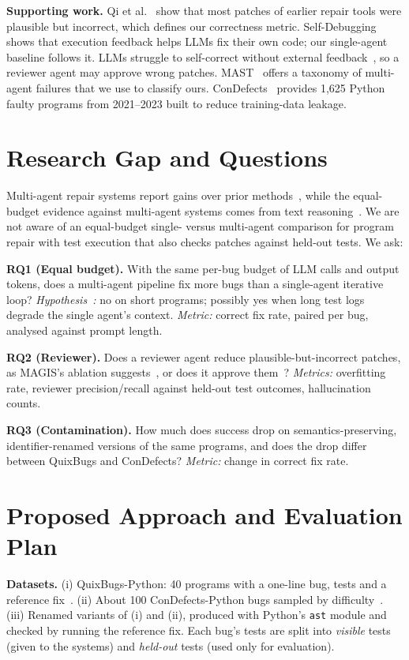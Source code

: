 \documentclass[conference]{IEEEtran}
\begin{document}
\textbf{Supporting work.} Qi et al.~\cite{qi2015} show that most patches of
earlier repair tools were plausible but incorrect, which defines our correctness
metric. Self-Debugging~\cite{selfdebug} shows that execution feedback helps
LLMs fix their own code; our single-agent baseline follows it. LLMs struggle to
self-correct without external feedback~\cite{selfcorrect}, so a reviewer agent
may approve wrong patches. MAST~\cite{mast} offers a taxonomy of multi-agent
failures that we use to classify ours. ConDefects~\cite{condefects} provides
1,625 Python faulty programs from 2021--2023 built to reduce training-data
leakage.

\section{Research Gap and Questions}
Multi-agent repair systems report gains over prior methods~\cite{unidebugger,magis},
while the equal-budget evidence against multi-agent systems comes from text
reasoning~\cite{trankiela}. We are not aware of an equal-budget single- versus
multi-agent comparison for program repair with test execution that also checks
patches against held-out tests. We ask:

\textbf{RQ1 (Equal budget).} With the same per-bug budget of LLM calls and output
tokens, does a multi-agent pipeline fix more bugs than a single-agent iterative
loop? \emph{Hypothesis~\cite{trankiela}:} no on short programs; possibly yes
when long test logs degrade the single agent's context. \emph{Metric:} correct
fix rate, paired per bug, analysed against prompt length.

\textbf{RQ2 (Reviewer).} Does a reviewer agent reduce plausible-but-incorrect
patches, as MAGIS's ablation suggests~\cite{magis}, or does it approve
them~\cite{selfcorrect}? \emph{Metrics:} overfitting rate, reviewer
precision/recall against held-out test outcomes, hallucination counts.

\textbf{RQ3 (Contamination).} How much does success drop on
semantics-preserving, identifier-renamed versions of the same programs, and
does the drop differ between QuixBugs and ConDefects? \emph{Metric:} change in
correct fix rate.

\section{Proposed Approach and Evaluation Plan}
\textbf{Datasets.} (i) QuixBugs-Python: 40 programs with a one-line bug,
tests and a reference fix~\cite{quixbugs}. (ii) About 100 ConDefects-Python
bugs sampled by difficulty~\cite{condefects}. (iii) Renamed variants of (i)
and (ii), produced with Python's \texttt{ast} module and checked by running the
reference fix. Each bug's tests are split into \emph{visible} tests (given to
the systems) and \emph{held-out} tests (used only for evaluation).
\end{document}
